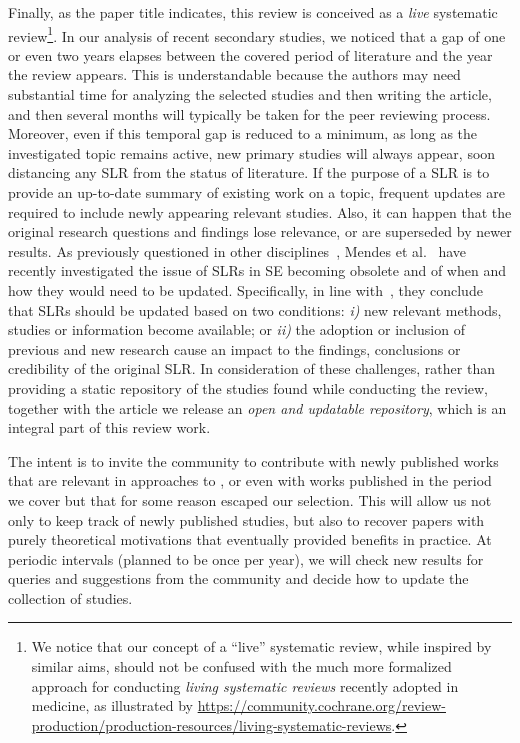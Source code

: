 Finally, as the paper title indicates, this review is conceived
as a \textit{live} systematic review\footnote{We notice that our concept of a ``live'' systematic review, while inspired by similar aims, should not be confused with the much more formalized approach for conducting \textit{living systematic reviews} recently adopted in medicine, as illustrated by \url{https://community.cochrane.org/review-production/production-resources/living-systematic-reviews}.}. 
In our analysis of recent secondary studies, we noticed that a gap of one or even two years elapses between the covered period of literature and the year the review appears. 
This is understandable because the authors  may need substantial time for analyzing the selected studies and then writing the article, and then several months will typically be taken for the peer reviewing process. 
Moreover, even if this temporal gap is reduced to a minimum, as long as the investigated topic remains active, new primary studies will always appear, soon distancing any SLR from the status of literature.  
If the purpose of a SLR is to provide an up-to-date summary of existing work on a topic, frequent updates are required to include newly appearing relevant studies.
Also, it can happen that the original research questions and findings lose relevance, or are superseded by newer results.
As previously questioned in other disciplines~\cite{Garneri3507}, Mendes et al.~\cite{MENDES2020110607} have recently investigated the issue of SLRs in SE becoming obsolete and of when and how they would  need to be updated. 
Specifically, in line with~\cite{Garneri3507}, they conclude that SLRs should be updated based on two conditions: \textit{i)} new relevant methods, studies or information become available; or \textit{ii)} the adoption or inclusion of previous and new research cause an impact to the findings, conclusions or credibility of the original SLR.
In consideration of these challenges, rather than providing a static repository of the studies found while conducting the review, together with the article we release an \textit{open and updatable repository}, which is an integral part of this review work.
 
The intent is to invite the community to contribute with 
newly published works that are relevant in \rea approaches to \rt, or even with works published in the period we cover but that for some reason escaped our selection.
This will allow us not only to keep track of newly published studies, 
but also to recover papers with purely theoretical motivations that eventually provided benefits in practice.
At periodic intervals (planned to be once per year), we will check new results for queries and suggestions from the community and decide how to update the collection of studies.

